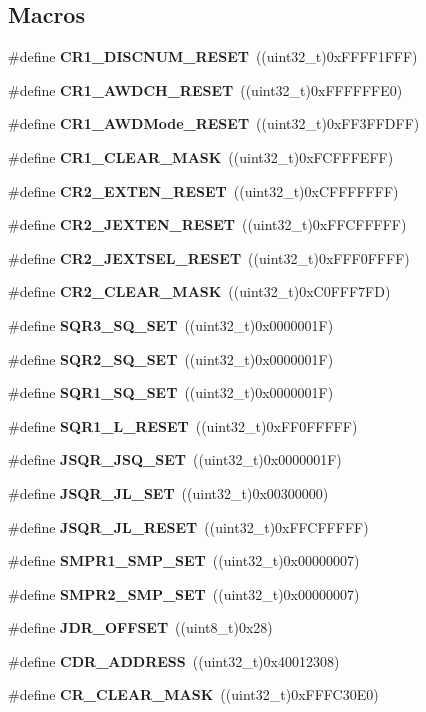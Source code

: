 \subsection*{Macros}
\begin{DoxyCompactItemize}
\item 
\#define \textbf{ C\+R1\+\_\+\+D\+I\+S\+C\+N\+U\+M\+\_\+\+R\+E\+S\+ET}~((uint32\+\_\+t)0x\+F\+F\+F\+F1\+F\+F\+F)
\item 
\#define \textbf{ C\+R1\+\_\+\+A\+W\+D\+C\+H\+\_\+\+R\+E\+S\+ET}~((uint32\+\_\+t)0x\+F\+F\+F\+F\+F\+F\+E0)
\item 
\#define \textbf{ C\+R1\+\_\+\+A\+W\+D\+Mode\+\_\+\+R\+E\+S\+ET}~((uint32\+\_\+t)0x\+F\+F3\+F\+F\+D\+F\+F)
\item 
\#define \textbf{ C\+R1\+\_\+\+C\+L\+E\+A\+R\+\_\+\+M\+A\+SK}~((uint32\+\_\+t)0x\+F\+C\+F\+F\+F\+E\+F\+F)
\item 
\#define \textbf{ C\+R2\+\_\+\+E\+X\+T\+E\+N\+\_\+\+R\+E\+S\+ET}~((uint32\+\_\+t)0x\+C\+F\+F\+F\+F\+F\+F\+F)
\item 
\#define \textbf{ C\+R2\+\_\+\+J\+E\+X\+T\+E\+N\+\_\+\+R\+E\+S\+ET}~((uint32\+\_\+t)0x\+F\+F\+C\+F\+F\+F\+F\+F)
\item 
\#define \textbf{ C\+R2\+\_\+\+J\+E\+X\+T\+S\+E\+L\+\_\+\+R\+E\+S\+ET}~((uint32\+\_\+t)0x\+F\+F\+F0\+F\+F\+F\+F)
\item 
\#define \textbf{ C\+R2\+\_\+\+C\+L\+E\+A\+R\+\_\+\+M\+A\+SK}~((uint32\+\_\+t)0x\+C0\+F\+F\+F7\+F\+D)
\item 
\#define \textbf{ S\+Q\+R3\+\_\+\+S\+Q\+\_\+\+S\+ET}~((uint32\+\_\+t)0x0000001\+F)
\item 
\#define \textbf{ S\+Q\+R2\+\_\+\+S\+Q\+\_\+\+S\+ET}~((uint32\+\_\+t)0x0000001\+F)
\item 
\#define \textbf{ S\+Q\+R1\+\_\+\+S\+Q\+\_\+\+S\+ET}~((uint32\+\_\+t)0x0000001\+F)
\item 
\#define \textbf{ S\+Q\+R1\+\_\+\+L\+\_\+\+R\+E\+S\+ET}~((uint32\+\_\+t)0x\+F\+F0\+F\+F\+F\+F\+F)
\item 
\#define \textbf{ J\+S\+Q\+R\+\_\+\+J\+S\+Q\+\_\+\+S\+ET}~((uint32\+\_\+t)0x0000001\+F)
\item 
\#define \textbf{ J\+S\+Q\+R\+\_\+\+J\+L\+\_\+\+S\+ET}~((uint32\+\_\+t)0x00300000)
\item 
\#define \textbf{ J\+S\+Q\+R\+\_\+\+J\+L\+\_\+\+R\+E\+S\+ET}~((uint32\+\_\+t)0x\+F\+F\+C\+F\+F\+F\+F\+F)
\item 
\#define \textbf{ S\+M\+P\+R1\+\_\+\+S\+M\+P\+\_\+\+S\+ET}~((uint32\+\_\+t)0x00000007)
\item 
\#define \textbf{ S\+M\+P\+R2\+\_\+\+S\+M\+P\+\_\+\+S\+ET}~((uint32\+\_\+t)0x00000007)
\item 
\#define \textbf{ J\+D\+R\+\_\+\+O\+F\+F\+S\+ET}~((uint8\+\_\+t)0x28)
\item 
\#define \textbf{ C\+D\+R\+\_\+\+A\+D\+D\+R\+E\+SS}~((uint32\+\_\+t)0x40012308)
\item 
\#define \textbf{ C\+R\+\_\+\+C\+L\+E\+A\+R\+\_\+\+M\+A\+SK}~((uint32\+\_\+t)0x\+F\+F\+F\+C30\+E0)
\end{DoxyCompactItemize}
